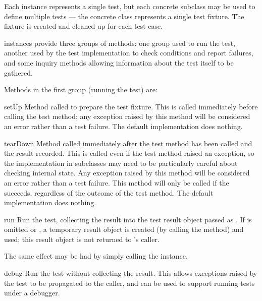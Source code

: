 Each  instance represents a single test, but each
concrete subclass may be used to define multiple tests --- the
concrete class represents a single test fixture.  The fixture is
created and cleaned up for each test case.

 instances provide three groups of methods: one group
used to run the test, another used by the test implementation to
check conditions and report failures, and some inquiry methods
allowing information about the test itself to be gathered.

Methods in the first group (running the test) are:

\begin{methoddesc}[TestCase]{setUp}{}
  Method called to prepare the test fixture.  This is called
  immediately before calling the test method; any exception raised by
  this method will be considered an error rather than a test failure.
  The default implementation does nothing.
\end{methoddesc}

\begin{methoddesc}[TestCase]{tearDown}{}
  Method called immediately after the test method has been called and
  the result recorded.  This is called even if the test method raised
  an exception, so the implementation in subclasses may need to be
  particularly careful about checking internal state.  Any exception
  raised by this method will be considered an error rather than a test
  failure.  This method will only be called if the 
  succeeds, regardless of the outcome of the test method.
  The default implementation does nothing.  
\end{methoddesc}

\begin{methoddesc}[TestCase]{run}{}
  Run the test, collecting the result into the test result object
  passed as .  If  is omitted or ,
  a temporary result object is created (by calling the
   method) and used; this result object is not
  returned to 's caller.
  
  The same effect may be had by simply calling the 
  instance.
\end{methoddesc}

\begin{methoddesc}[TestCase]{debug}{}
  Run the test without collecting the result.  This allows exceptions
  raised by the test to be propagated to the caller, and can be used
  to support running tests under a debugger.
\end{methoddesc}


